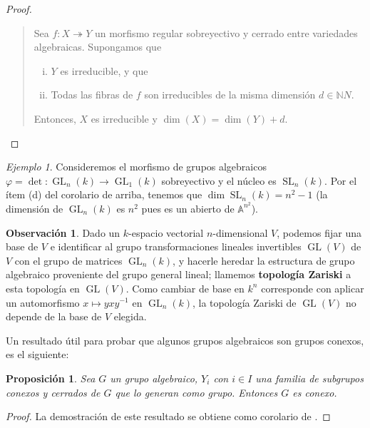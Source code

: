 \documentclass[spanish,10pt]{amsart}
\newtheorem{proposition}[theorem]{Proposición}
\theoremstyle{definition}
\newtheorem{obs}[theorem]{Observación}
\theoremstyle{remark}
\newtheorem{example}[theorem]{Ejemplo}
\numberwithin{equation}{section}
\newcommand{\afine}[1]{\mathbb{A}^{#1}}
\newcommand{\naturals}{\mathbb{N}}
\begin{document}
\begin{proof}
\begin{enumerate}[(a)]
\begin{quote}
Sea $f : X \twoheadrightarrow Y$ un morfismo regular sobreyectivo y cerrado entre variedades algebraicas. Supongamos que
\begin{enumerate}[(i)]
\item $Y$ es irreducible, y que
\item Todas las fibras de $f$ son irreducibles de la misma dimensión $d \in \naturals N$.
\end{enumerate}
Entonces, $X$ es irreducible y $\dim (X) = \dim (Y) + d$.
\end{quote}
\end{enumerate}
\end{proof}

\begin{example}
Consideremos el morfismo de grupos algebraicos $\varphi = \det : \operatorname{GL}_n (k) \to \operatorname{GL}_{1} (k)$ sobreyectivo y el núcleo es $\operatorname{SL}_n (k)$. Por el ítem (d) del corolario de arriba, tenemos que $\dim \operatorname{SL}_n (k) = n^2 -1$ (la dimensión de $\operatorname{GL}_n (k)$ es $n^2$ pues es un abierto de $\afine{n^2}$).
\end{example}

\begin{obs}
Dado un $k$-espacio vectorial $n$-dimensional $V$, podemos fijar una base de $V$ e identificar al grupo transformaciones lineales invertibles $\operatorname{GL} (V)$ de $V$ con el grupo de matrices $\operatorname{GL}_n (k)$, y hacerle heredar la estructura de grupo algebraico proveniente del grupo general lineal; llamemos \textbf{topología Zariski} a esta topología en $\operatorname{GL}(V)$. Como cambiar de base en $k^n$ corresponde con aplicar un automorfismo $x \mapsto y x y^{-1}$ en $\operatorname{GL}_n (k)$, la topología Zariski de $\operatorname{GL} (V)$ no depende de la base de $V$ elegida.
\end{obs}

Un resultado útil para probar que algunos grupos algebraicos son grupos conexos, es el siguiente:
\begin{proposition}\label{proposition:proposicion util para probar que un grupo algebraico es conexo}
Sea $G$ un grupo algebraico, $Y_i $ con $i \in I$ una familia de subgrupos conexos y cerrados de $G$ que lo generan como grupo. Entonces $G$ es conexo.
\end{proposition}
\begin{proof}
La demostración de este resultado se obtiene como corolario de \cite[Proposición \S 7.5]{humphreys2012linearAlgebraicGroups}.
\end{proof}
\end{document}
